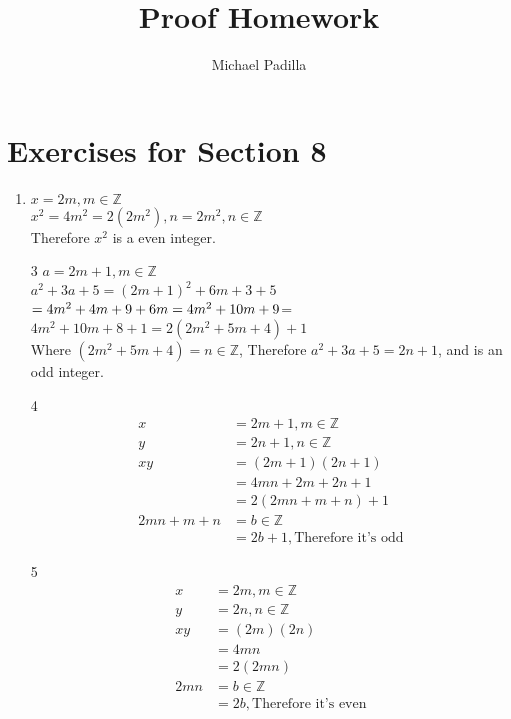 \documentclass[12pt]{article}
\title{Proof Homework}
\author{Michael Padilla}
\begin{document}
 
\maketitle
\section*{Exercises for Section 8}
\begin{enumerate}
    \item $x = 2m, m \in \mathbb{Z}$\\
	$x^2 = 4m^2 = 2(2m^2), n = 2m^2, n \in \mathbb{Z}$\\
	Therefore $x^2$ is a even integer.
    \item [3] $a = 2m + 1, m \in \mathbb{Z}$\\
	$a^2 + 3a + 5 = (2m+1)^2 + 6m + 3 + 5$\\
	$= 4m^2 + 4m + 9 + 6m = 4m^2 + 10m + 9\\
	$= $4m^2 + 10m + 8 + 1 = 2(2m^2 + 5m + 4) + 1$\\
	Where $(2m^2 + 5m + 4) = n \in \mathbb{Z}$, Therefore $a^2 + 3a + 5 = 2n + 1$, and is an odd integer.
    \item [4]
	\begin{equation*}
	    \begin{split}
		x &= 2m + 1, m \in \mathbb{Z} \\
		y &= 2n + 1, n \in \mathbb{Z} \\
		xy &= (2m + 1)(2n + 1)\\
		&= 4mn + 2m + 2n + 1\\
		&= 2(2mn + m + n) + 1\\
		2mn + m +n &= b \in \mathbb{Z}\\
		&= 2b + 1, \text{Therefore it's odd}
	    \end{split}
	\end{equation*}
    \item [5]
	\begin{equation*}
	    \begin{split}
		x &= 2m, m \in \mathbb{Z} \\
		y &= 2n, n \in \mathbb{Z} \\
		xy &= (2m)(2n)\\
		&= 4mn\\
		&= 2(2mn)\\
		2mn &= b \in \mathbb{Z}\\
		&= 2b, \text{Therefore it's even}
	    \end{split}
	\end{equation*}

\end{enumerate}
\end{document}
